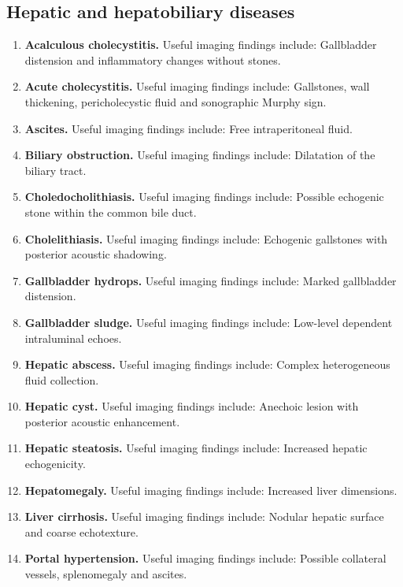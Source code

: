 \subsection{Hepatic and hepatobiliary diseases}
\begin{enumerate}[leftmargin=*,itemsep=0.45em,topsep=0.4em]
\item \textbf{Acalculous cholecystitis.} Useful imaging findings include: Gallbladder distension and inflammatory changes without stones.
\item \textbf{Acute cholecystitis.} Useful imaging findings include: Gallstones, wall thickening, pericholecystic fluid and sonographic Murphy sign.
\item \textbf{Ascites.} Useful imaging findings include: Free intraperitoneal fluid.
\item \textbf{Biliary obstruction.} Useful imaging findings include: Dilatation of the biliary tract.
\item \textbf{Choledocholithiasis.} Useful imaging findings include: Possible echogenic stone within the common bile duct.
\item \textbf{Cholelithiasis.} Useful imaging findings include: Echogenic gallstones with posterior acoustic shadowing.
\item \textbf{Gallbladder hydrops.} Useful imaging findings include: Marked gallbladder distension.
\item \textbf{Gallbladder sludge.} Useful imaging findings include: Low-level dependent intraluminal echoes.
\item \textbf{Hepatic abscess.} Useful imaging findings include: Complex heterogeneous fluid collection.
\item \textbf{Hepatic cyst.} Useful imaging findings include: Anechoic lesion with posterior acoustic enhancement.
\item \textbf{Hepatic steatosis.} Useful imaging findings include: Increased hepatic echogenicity.
\item \textbf{Hepatomegaly.} Useful imaging findings include: Increased liver dimensions.
\item \textbf{Liver cirrhosis.} Useful imaging findings include: Nodular hepatic surface and coarse echotexture.
\item \textbf{Portal hypertension.} Useful imaging findings include: Possible collateral vessels, splenomegaly and ascites.
\end{enumerate}

